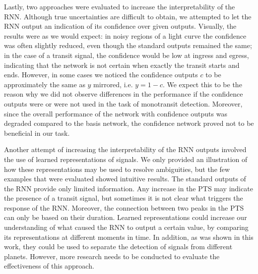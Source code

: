 Lastly, two approaches were evaluated to increase the interpretability of the RNN. Although true uncertainties are difficult to obtain, we attempted to let the RNN output an indication of its confidence over given outputs. Visually, the results were as we would expect: in noisy regions of a light curve the confidence was often slightly reduced, even though the standard outputs remained the same; in the case of a transit signal, the confidence would be low at ingress and egress, indicating that the network is not certain when exactly the transit starts and ends. However, in some cases we noticed the confidence outputs $c$ to be approximately the same as $y$ mirrored, i.e. $y = 1-c$. We expect this to be the reason why we did not observe differences in the performance if the confidence outputs were or were not used in the task of monotransit detection. Moreover, since the overall performance of the network with confidence outputs was degraded compared to the basis network, the confidence network proved not to be beneficial in our task.

Another attempt of increasing the interpretability of the RNN outputs involved the use of learned representations of signals. We only provided an illustration of how these representations may be used to resolve ambiguities, but the few examples that were evaluated showed intuitive results. The standard outputs of the RNN provide only limited information. Any increase in the PTS may indicate the presence of a transit signal, but sometimes it is not clear what triggers the response of the RNN. Moreover, the connection between two peaks in the PTS can only be based on their duration. Learned representations could increase our understanding of what caused the RNN to output a certain value, by comparing its representations at different moments in time. In addition, as was shown in this work, they could be used to separate the detection of signals from different planets. However, more research needs to be conducted to evaluate the effectiveness of this approach.
